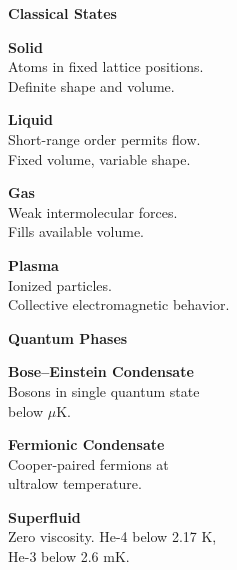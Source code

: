 \newpage

\begin{tcolorbox}[
  enhanced,
  colback=blue!2,
  colframe=blue!35,
  coltitle=white,
  fonttitle=\bfseries\Large,
  title={Phases of Matter},
  attach boxed title to top center={yshift=-2mm},
  boxed title style={colback=blue!35, sharp corners},
  arc=0mm,
  boxrule=0.5pt,
  left=6pt,
  right=6pt,
  top=6pt,
  bottom=6pt,
  width=\textwidth
]

\begin{multicols}{2}
\raggedright

\colorbox{blue!15}{\textbf{\large Classical States}}\vspace{3pt}

\textbf{Solid}\\
{\footnotesize Atoms in fixed lattice positions.\\Definite shape and volume.}\vspace{6pt}

\textbf{Liquid}\\
{\footnotesize Short-range order permits flow.\\Fixed volume, variable shape.}\vspace{6pt}

\textbf{Gas}\\
{\footnotesize Weak intermolecular forces.\\Fills available volume.}\vspace{6pt}

\textbf{Plasma}\\
{\footnotesize Ionized particles.\\Collective electromagnetic behavior.}\vspace{12pt}

\colorbox{blue!15}{\textbf{\large Quantum Phases}}\vspace{3pt}

\textbf{Bose–Einstein Condensate}\\
{\footnotesize Bosons in single quantum state\\below $\mu$K.}\vspace{6pt}

\textbf{Fermionic Condensate}\\
{\footnotesize Cooper-paired fermions at\\ultralow temperature.}\vspace{6pt}

\textbf{Superfluid}\\
{\footnotesize Zero viscosity. He-4 below 2.17 K,\\He-3 below 2.6 mK.}\vspace{6pt}


\end{multicols}
\end{tcolorbox}

